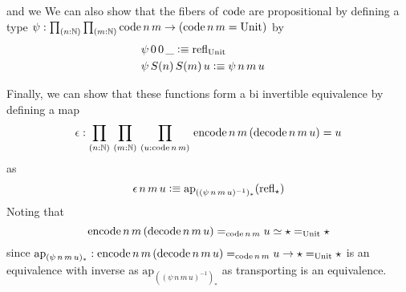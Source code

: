 \documentclass[main.tex]{subfiles}
\begin{document}
and we 
We can also show that the fibers of $\text{code}$ are propositional by defining a type $\psi : \prd{n : \mathbb{N}}{m : \mathbb{N}}\co\,n\,m \to (\co\,n\,m = \Un)$ by
\begin{align*}
    &\psi\,0\,0\,\_\vcentcolon\equiv \text{refl}_{\text{Unit}}\\
    &\psi\,S(n)\,S(m)\,u\vcentcolon\equiv\psi\,n\,m\,u&
\end{align*}

Finally, we can show that these functions form a bi invertible equivalence by defining a map $$\epsilon : \prd{n:\mathbb{N}}{m:\mathbb{N}}{u : \co \, n\, m}\eco\,n\,m\,(\dco\,n\,m \,u) =u$$
as
\begin{align*}
    \epsilon\,n\,m\,u \vcentcolon\equiv \text{ap}_{((\psi\,n\,m\,u)^{-1})_*}(\text{refl}_{\star})
\end{align*}
Noting that 
\begin{equation}
    \text{encode}\,n\,m\,(\text{decode}\,n\,m \,u) =_{\text{code}\,n\,m} u \simeq \star =_{\text{Unit}} \star
\end{equation}
since $\text{ap}_{(\psi\,n\,m\,u)_*}: \text{encode}\,n\,m\,(\text{decode}\,n\,m \,u) =_{\text{code}\,n\,m} u \to \star =_{\text{Unit}} \star$ is an equivalence with inverse as $\text{ap}_{((\psi\,n\,m\,u)^{-1})_*}$ as transporting 
is an equivalence.
\end{document}
